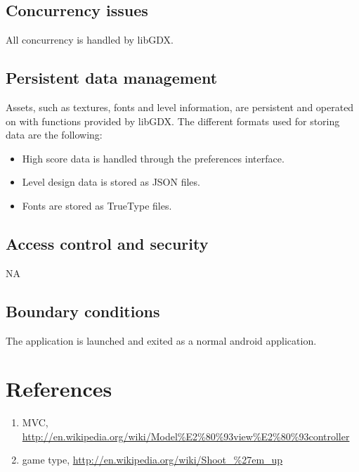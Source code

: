 \documentclass{article}
\begin{document}
\subsection{Concurrency issues}
All concurrency is handled by libGDX.

\subsection{Persistent data management}
Assets, such as textures, fonts and level information, are persistent and operated on with functions provided by libGDX. The different formats used for storing data are the following: 
\begin{itemize}
  \item High score data is handled through the preferences interface.
  \item Level design data is stored as JSON files.
  \item Fonts are stored as TrueType files.
\end{itemize}

\subsection{Access control and security}
NA


\subsection{Boundary conditions}
The application is launched and exited as a normal android application.

\section{References}
\begin{enumerate}
  \item MVC, \url{http://en.wikipedia.org/wiki/Model%E2%80%93view%E2%80%93controller}
  \item game type, \url{http://en.wikipedia.org/wiki/Shoot_%27em_up}
\end{enumerate}
\end{document}
